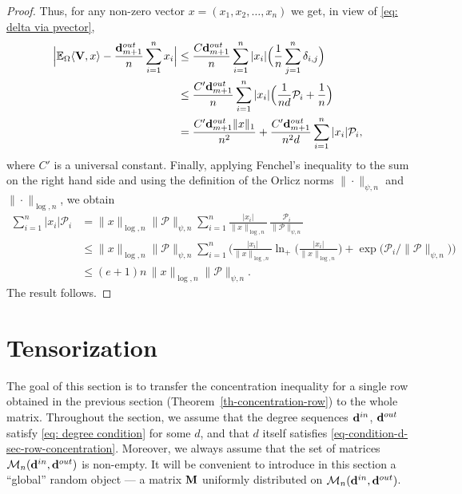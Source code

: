 \documentclass[12pt]{article}
\theoremstyle{definition}
\theoremstyle{plain}
\newcommand{\E}{\mathbb{E}}
\def\ranmtx{{\bf{}M}}
\def\InDeg{{\bf d}^{in}}
\def\OutDeg{{\bf d}^{out}}
\def\MatrixSet{{\mathcal M}_n}
\def\pvector{{\mathcal P}}
\begin{document}
\begin{proof}
Thus, for any non-zero vector $x=(x_1,x_2,\ldots,x_n)$ we get, in view of \eqref{eq: delta via pvector},
\begin{align*}
\Bigl|\E_{\Omega}\langle {\bf{}V},x\rangle-\frac{\OutDeg_{m+1}}{n}\sum_{i=1}^n x_i\Bigr|
&\leq \frac{C\OutDeg_{m+1}}{n}\sum_{i=1}^n |x_i|\Bigl(\frac{1}{n}\sum_{j=1}^n
\delta_{i,j}\Bigr)\\
&\leq  \frac{C'\OutDeg_{m+1}}{n}
\sum_{i=1}^n |x_i|\Bigl(\frac{1}{nd}\pvector_i+\frac{1}{n}\Bigr)\\
&=\frac{C'\OutDeg_{m+1}\|x\|_1}{n^2}+\frac{C'\OutDeg_{m+1}}{n^2d}\sum_{i=1}^n |x_i|\pvector_i,
\end{align*}
where $C'$ is a universal constant.
Finally, applying Fenchel's inequality to the sum on the right hand side and using the definition of the Orlicz norms
$\|\cdot\|_{\psi,n}$ and $\|\cdot\|_{\log,n}$, we obtain
\begin{align*}
\sum_{i=1}^n |x_i|\pvector_i
&=\|x\|_{\log,n}\|\pvector\|_{\psi,n}\sum_{i=1}^n \frac{|x_i|}{\|x\|_{\log,n}}\,\frac{\pvector_i}{\|\pvector\|_{\psi,n}}\\
&\leq \|x\|_{\log,n}\|\pvector\|_{\psi,n}\sum_{i=1}^n \bigg(\frac{|x_i|}{\|x\|_{\log,n}}\ln_+\Big(\frac{|x_i|}{\|x\|_{\log,n}}\Big)
+\exp\big(\pvector_i/\|\pvector\|_{\psi,n}\big)\bigg)\\
&\leq (e+1)n\,\|x\|_{\log,n}\|\pvector\|_{\psi,n}.
\end{align*}
The result follows.
\end{proof}







\section{Tensorization}\label{s: tensorization}

The goal of this section is to transfer the concentration inequality for a single row obtained
in the previous section (Theorem~\ref{th-concentration-row}) to the whole matrix.
Throughout the section, we assume that the degree sequences $\InDeg$, $\OutDeg$
satisfy \eqref{eq: degree condition} for some $d$, and that $d$ itself satisfies
\eqref{eq-condition-d-sec-row-concentration}.
Moreover, we always assume that the set of matrices $\MatrixSet(\InDeg,\OutDeg)$ is non-empty.
It will be convenient to introduce in this section a ``global'' random object --- a matrix $\ranmtx$
uniformly distributed on $\MatrixSet(\InDeg,\OutDeg)$.
\end{document}
